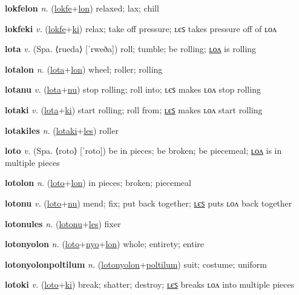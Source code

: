 \textbf{\hypertarget{lokfelon}{lokfelon}} \textit{n.} (\hyperlink{lokfe}{lokfe}+\allowbreak \hyperlink{lon}{lon})
relaxed; lax; chill

\textbf{\hypertarget{lokfeki}{lokfeki}} \textit{v.} (\hyperlink{lokfe}{lokfe}+\allowbreak \hyperlink{ki}{ki})
relax; take off pressure; ʟєꜱ takes pressure off of ʟᴏᴧ

\textbf{\hypertarget{lota}{lota}} \textit{v.} (Spa. ⟨rueda⟩ [ˈrweða])
roll; tumble; be rolling; \hyperlink{lotalon}{ʟᴏᴧ} is rolling

\textbf{\hypertarget{lotalon}{lotalon}} \textit{n.} (\hyperlink{lota}{lota}+\allowbreak \hyperlink{lon}{lon})
wheel; roller; rolling

\textbf{\hypertarget{lotanu}{lotanu}} \textit{v.} (\hyperlink{lota}{lota}+\allowbreak \hyperlink{nu}{nu})
stop rolling; roll into; ʟєꜱ makes ʟᴏᴧ stop rolling

\textbf{\hypertarget{lotaki}{lotaki}} \textit{v.} (\hyperlink{lota}{lota}+\allowbreak \hyperlink{ki}{ki})
start rolling; roll from; \hyperlink{lotakiles}{ʟєꜱ} makes ʟᴏᴧ start rolling

\textbf{\hypertarget{lotakiles}{lotakiles}} \textit{n.} (\hyperlink{lotaki}{lotaki}+\allowbreak \hyperlink{les}{les})
roller

\textbf{\hypertarget{loto}{loto}} \textit{v.} (Spa. ⟨roto⟩ [ˈroto])
be in pieces; be broken; be piecemeal; \hyperlink{lotolon}{ʟᴏᴧ} is in multiple pieces

\textbf{\hypertarget{lotolon}{lotolon}} \textit{n.} (\hyperlink{loto}{loto}+\allowbreak \hyperlink{lon}{lon})
in pieces; broken; piecemeal

\textbf{\hypertarget{lotonu}{lotonu}} \textit{v.} (\hyperlink{loto}{loto}+\allowbreak \hyperlink{nu}{nu})
mend; fix; put back together; \hyperlink{lotonules}{ʟєꜱ} puts ʟᴏᴧ back together

\textbf{\hypertarget{lotonules}{lotonules}} \textit{n.} (\hyperlink{lotonu}{lotonu}+\allowbreak \hyperlink{les}{les})
fixer

\textbf{\hypertarget{lotonyolon}{lotonyolon}} \textit{n.} (\hyperlink{loto}{loto}+\allowbreak \hyperlink{nyo}{nyo}+\allowbreak \hyperlink{lon}{lon})
whole; entirety; entire

\textbf{\hypertarget{lotonyolonpoltilum}{lotonyolonpoltilum}} \textit{n.} (\hyperlink{lotonyolon}{lotonyolon}+\allowbreak \hyperlink{poltilum}{poltilum})
suit; costume; uniform

\textbf{\hypertarget{lotoki}{lotoki}} \textit{v.} (\hyperlink{loto}{loto}+\allowbreak \hyperlink{ki}{ki})
break; shatter; destroy; \hyperlink{lotokiles}{ʟєꜱ} breaks ʟᴏᴧ into multiple pieces

